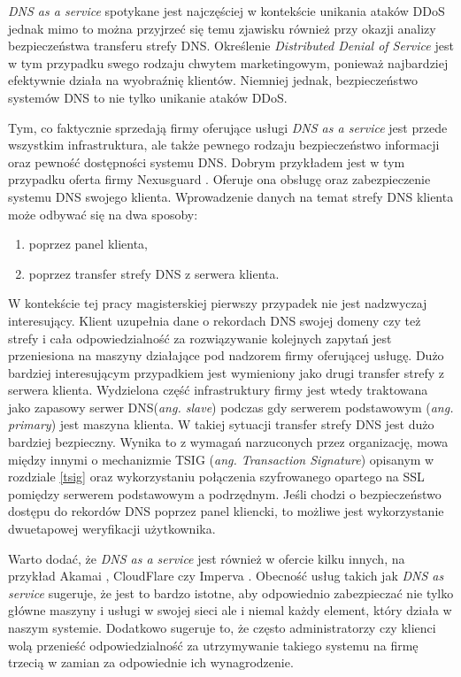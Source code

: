 \textit{DNS as a service} spotykane jest najczęściej w kontekście unikania ataków DDoS jednak mimo to można przyjrzeć się temu
zjawisku również przy okazji analizy bezpieczeństwa transferu strefy DNS. Określenie \textit{Distributed Denial of Service} jest w
tym przypadku swego rodzaju chwytem marketingowym, ponieważ najbardziej efektywnie działa na wyobraźnię klientów. Niemniej jednak,
bezpieczeństwo systemów DNS to nie tylko unikanie ataków DDoS.

Tym, co faktycznie sprzedają firmy oferujące usługi \textit{DNS as a service} jest przede wszystkim infrastruktura, ale także
pewnego rodzaju bezpieczeństwo informacji oraz pewność dostępności systemu DNS. Dobrym przykładem jest w tym przypadku oferta firmy
Nexusguard \cite{nexusguard}. Oferuje ona obsługę oraz zabezpieczenie systemu DNS swojego klienta. Wprowadzenie danych na temat strefy
DNS klienta może odbywać się na dwa sposoby:
\begin{enumerate}
	\item poprzez panel klienta,
	\item poprzez transfer strefy DNS z serwera klienta.
\end{enumerate}
W kontekście tej pracy magisterskiej pierwszy przypadek nie jest nadzwyczaj interesujący. Klient uzupełnia dane o rekordach DNS
swojej domeny czy też strefy i cała odpowiedzialność za rozwiązywanie kolejnych zapytań jest przeniesiona na maszyny działające
pod nadzorem firmy oferującej usługę. Dużo bardziej interesującym przypadkiem jest wymieniony jako drugi transfer strefy z serwera
klienta. Wydzielona część infrastruktury firmy jest wtedy traktowana jako zapasowy serwer DNS(\textit{ang. slave}) podczas gdy
serwerem podstawowym (\textit{ang. primary}) jest maszyna klienta. W takiej sytuacji transfer strefy DNS jest dużo bardziej bezpieczny. Wynika to
z wymagań narzuconych przez organizację, mowa między innymi o mechanizmie TSIG (\textit{ang. Transaction Signature})  opisanym w
rozdziale \ref{tsig} oraz wykorzystaniu połączenia szyfrowanego opartego na SSL pomiędzy serwerem podstawowym a podrzędnym. Jeśli
chodzi o bezpieczeństwo dostępu do rekordów DNS poprzez panel kliencki, to możliwe jest wykorzystanie dwuetapowej weryfikacji użytkownika.

Warto dodać, że \textit{DNS as a service} jest również w ofercie kilku innych, na przykład Akamai \cite{akamai},
CloudFlare \cite{cloudflare} czy Imperva \cite{incapsula}. Obecność usług takich jak \textit{DNS as service} sugeruje, że jest to bardzo
istotne, aby odpowiednio zabezpieczać nie tylko główne maszyny i usługi w swojej sieci ale i niemal każdy element, który działa
w naszym systemie. Dodatkowo sugeruje to, że często administratorzy czy klienci wolą przenieść odpowiedzialność za utrzymywanie
takiego systemu na firmę trzecią w zamian za odpowiednie ich wynagrodzenie.

